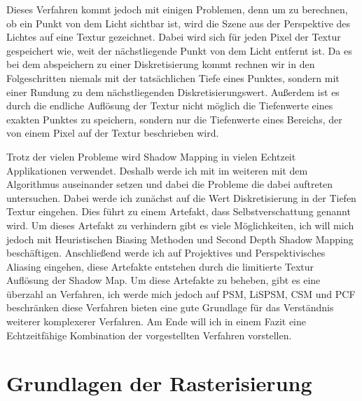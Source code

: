 Dieses Verfahren kommt jedoch mit einigen Problemen, denn um zu berechnen, ob ein Punkt von dem Licht sichtbar ist,
wird die Szene aus der Perspektive des Lichtes auf eine Textur gezeichnet.
Dabei wird sich für jeden Pixel der Textur gespeichert wie, weit der nächstliegende Punkt von dem Licht entfernt ist.
Da es bei dem abspeichern zu einer Diskretisierung kommt rechnen 
wir in den Folgeschritten niemals mit der tatsächlichen Tiefe eines Punktes,
sondern mit einer Rundung zu dem nächstliegenden Diskretisierungswert.
Außerdem ist es durch die endliche Auflösung der Textur nicht möglich die Tiefenwerte eines exakten Punktes zu speichern,
sondern nur die Tiefenwerte eines Bereichs, der von einem Pixel auf der Textur beschrieben wird.
\par
Trotz der vielen Probleme wird Shadow Mapping in vielen Echtzeit Applikationen verwendet.
Deshalb werde ich mit im weiteren mit dem Algorithmus auseinander setzen und dabei die Probleme die dabei auftreten untersuchen.
Dabei werde ich zunächst auf die Wert Diskretisierung in der Tiefen Textur eingehen.
Dies führt zu einem Artefakt, dass Selbstverschattung genannt wird. 
Um dieses Artefakt zu verhindern gibt es viele Möglichkeiten, ich will mich jedoch mit Heuristischen Biasing Methoden und Second Depth Shadow Mapping beschäftigen.
Anschließend werde ich auf Projektives und Perspektivisches Aliasing eingehen, diese Artefakte entstehen durch 
die limitierte Textur Auflösung der Shadow Map.
Um diese Artefakte zu beheben, gibt es eine überzahl an Verfahren, ich werde mich jedoch auf PSM, LiSPSM, CSM und PCF beschränken 
diese Verfahren bieten eine gute Grundlage für das Verständnis weiterer komplexerer Verfahren.
Am Ende will ich in einem Fazit eine Echtzeitfähige Kombination der vorgestellten Verfahren vorstellen.



\chapter{Grundlagen der Rasterisierung}
